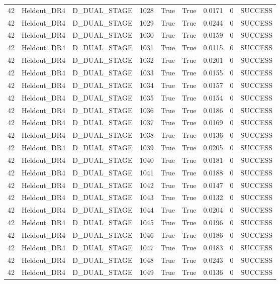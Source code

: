 \documentclass[11pt,a4paper,oneside]{book}
\begin{document}
\begin{longtable}{l l l l l l l l l}
42 & Heldout\_DR4 & D\_DUAL\_STAGE & 1028 & True & True & 0.0171 & 0 & SUCCESS \\
42 & Heldout\_DR4 & D\_DUAL\_STAGE & 1029 & True & True & 0.0244 & 0 & SUCCESS \\
42 & Heldout\_DR4 & D\_DUAL\_STAGE & 1030 & True & True & 0.0159 & 0 & SUCCESS \\
42 & Heldout\_DR4 & D\_DUAL\_STAGE & 1031 & True & True & 0.0115 & 0 & SUCCESS \\
42 & Heldout\_DR4 & D\_DUAL\_STAGE & 1032 & True & True & 0.0201 & 0 & SUCCESS \\
42 & Heldout\_DR4 & D\_DUAL\_STAGE & 1033 & True & True & 0.0155 & 0 & SUCCESS \\
42 & Heldout\_DR4 & D\_DUAL\_STAGE & 1034 & True & True & 0.0157 & 0 & SUCCESS \\
42 & Heldout\_DR4 & D\_DUAL\_STAGE & 1035 & True & True & 0.0154 & 0 & SUCCESS \\
42 & Heldout\_DR4 & D\_DUAL\_STAGE & 1036 & True & True & 0.0186 & 0 & SUCCESS \\
42 & Heldout\_DR4 & D\_DUAL\_STAGE & 1037 & True & True & 0.0169 & 0 & SUCCESS \\
42 & Heldout\_DR4 & D\_DUAL\_STAGE & 1038 & True & True & 0.0136 & 0 & SUCCESS \\
42 & Heldout\_DR4 & D\_DUAL\_STAGE & 1039 & True & True & 0.0205 & 0 & SUCCESS \\
42 & Heldout\_DR4 & D\_DUAL\_STAGE & 1040 & True & True & 0.0181 & 0 & SUCCESS \\
42 & Heldout\_DR4 & D\_DUAL\_STAGE & 1041 & True & True & 0.0188 & 0 & SUCCESS \\
42 & Heldout\_DR4 & D\_DUAL\_STAGE & 1042 & True & True & 0.0147 & 0 & SUCCESS \\
42 & Heldout\_DR4 & D\_DUAL\_STAGE & 1043 & True & True & 0.0132 & 0 & SUCCESS \\
42 & Heldout\_DR4 & D\_DUAL\_STAGE & 1044 & True & True & 0.0204 & 0 & SUCCESS \\
42 & Heldout\_DR4 & D\_DUAL\_STAGE & 1045 & True & True & 0.0196 & 0 & SUCCESS \\
42 & Heldout\_DR4 & D\_DUAL\_STAGE & 1046 & True & True & 0.0186 & 0 & SUCCESS \\
42 & Heldout\_DR4 & D\_DUAL\_STAGE & 1047 & True & True & 0.0183 & 0 & SUCCESS \\
42 & Heldout\_DR4 & D\_DUAL\_STAGE & 1048 & True & True & 0.0243 & 0 & SUCCESS \\
42 & Heldout\_DR4 & D\_DUAL\_STAGE & 1049 & True & True & 0.0136 & 0 & SUCCESS \\

\end{longtable}
\end{document}
